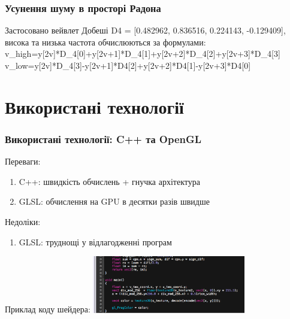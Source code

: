 \documentclass[12pt]{beamer}
\begin{document}
\begin{frame}\frametitle{Усунення шуму в просторі Радона}
	Застосовано вейвлет Добеші D4 = [0.482962, 0.836516, 0.224143, -0.129409], висока та низька частота обчислюються за формулами: \linebreak 
	v_{high}=y[2v]*D_{4}[0]+y[2v+1]*D_{4}[1]+y[2v+2]*D_{4}[2]+y[2v+3]*D_{4}[3] \linebreak \linebreak
	v_{low}=y[2v]*D_{4}[3]-y[2v+1]*D{4}[2]+y[2v+2]*D{4}[1]-y[2v+3]*D{4}[0] \linebreak
\end{frame}

\section{Використані технології}
\begin{frame}\frametitle{Використані технології: C++ та OpenGL}
	Переваги:
	\begin{enumerate}
		\item C++: швидкість обчислень  + гнучка архітектура
		\item GLSL: обчислення на GPU в десятки разів швидше  
	\end{enumerate}
	Недоліки:
	\begin{enumerate}
		\item GLSL: труднощі у відлагодженні програм
	\end{enumerate}
	
	Приклад коду шейдера:
	\includegraphics[height=2.5cm]{images/shader_snapshot}
\end{frame}
\end{document}
